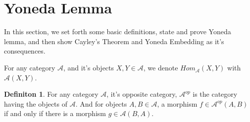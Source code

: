 \documentclass[18pt,a4paper]{article}
\theoremstyle{definition}
\newtheorem{definition}[theorem]{Definiton}
\begin{document}
\section{Yoneda Lemma} %
In this section, we set forth some basic definitions, state and prove Yoneda lemma, and then
show Cayley's Theorem and Yoneda Embedding as it's consequences.

For any category $\mathcal{A}$, and it's objects $X,Y\in \mathcal{A} $,
we denote $Hom_{\mathcal{A}}^{\mbox{}}(X,Y)$ with $\mathcal{A} (X,Y)$.

\begin{definition} %
	For any category $\mathcal{A} $, it's opposite category, $\mathcal{A}^{op}$
	is the category having the objects of $\mathcal{A}$.
	And for objects $A,B \in \mathcal{A} $, a morphism $f \in \mathcal{A}^{op} (A,B)$
	if and only if there is a morphism $g \in \mathcal{A}(B,A)$.
\end{definition}
\end{document}
